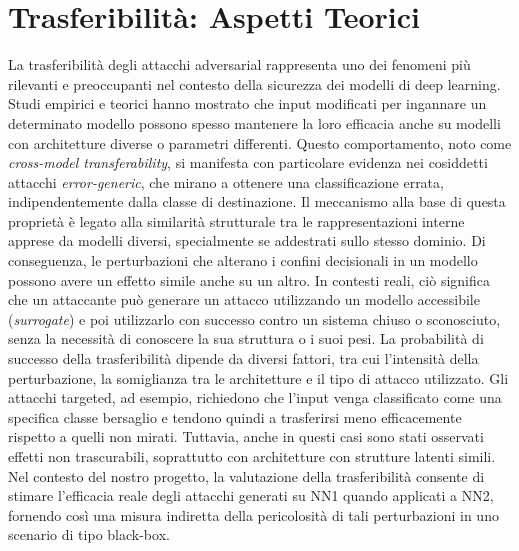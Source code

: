    \section{Trasferibilità: Aspetti Teorici}
        La trasferibilità degli attacchi adversarial rappresenta uno dei fenomeni più rilevanti e preoccupanti nel contesto della sicurezza dei modelli di deep learning. Studi empirici e teorici hanno mostrato che input modificati per ingannare un determinato modello possono spesso mantenere la loro efficacia anche su modelli con architetture diverse o parametri differenti. Questo comportamento, noto come \textit{cross-model transferability}, si manifesta con particolare evidenza nei cosiddetti attacchi \textit{error-generic}, che mirano a ottenere una classificazione errata, indipendentemente dalla classe di destinazione.
        Il meccanismo alla base di questa proprietà è legato alla similarità strutturale tra le rappresentazioni interne apprese da modelli diversi, specialmente se addestrati sullo stesso dominio. Di conseguenza, le perturbazioni che alterano i confini decisionali in un modello possono avere un effetto simile anche su un altro. In contesti reali, ciò significa che un attaccante può generare un attacco utilizzando un modello accessibile (\textit{surrogate}) e poi utilizzarlo con successo contro un sistema chiuso o sconosciuto, senza la necessità di conoscere la sua struttura o i suoi pesi.
        La probabilità di successo della trasferibilità dipende da diversi fattori, tra cui l’intensità della perturbazione, la somiglianza tra le architetture e il tipo di attacco utilizzato. Gli attacchi targeted, ad esempio, richiedono che l’input venga classificato come una specifica classe bersaglio e tendono quindi a trasferirsi meno efficacemente rispetto a quelli non mirati. Tuttavia, anche in questi casi sono stati osservati effetti non trascurabili, soprattutto con architetture con strutture latenti simili.
        Nel contesto del nostro progetto, la valutazione della trasferibilità consente di stimare l’efficacia reale degli attacchi generati su NN1 quando applicati a NN2, fornendo così una misura indiretta della pericolosità di tali perturbazioni in uno scenario di tipo black-box.
    
